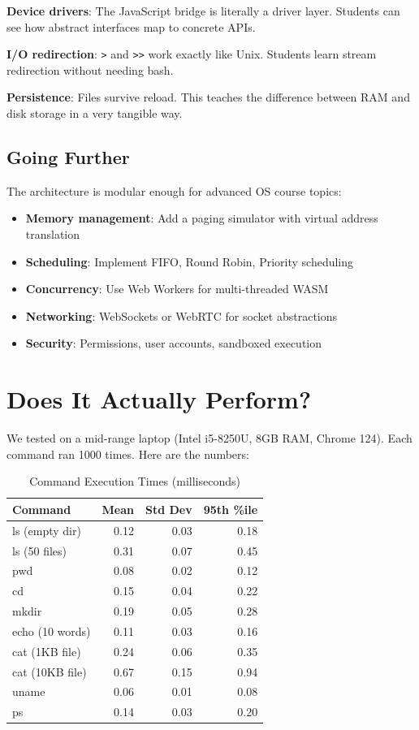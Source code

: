 \documentclass[conference]{IEEEtran}
\begin{document}
\textbf{Device drivers}: The JavaScript bridge is literally a driver layer. Students can see how abstract interfaces map to concrete APIs.

\textbf{I/O redirection}: \texttt{>} and \texttt{>>} work exactly like Unix. Students learn stream redirection without needing bash.

\textbf{Persistence}: Files survive reload. This teaches the difference between RAM and disk storage in a very tangible way.

\subsection{Going Further}

The architecture is modular enough for advanced OS course topics:

\begin{itemize}
    \item \textbf{Memory management}: Add a paging simulator with virtual address translation
    \item \textbf{Scheduling}: Implement FIFO, Round Robin, Priority scheduling
    \item \textbf{Concurrency}: Use Web Workers for multi-threaded WASM
    \item \textbf{Networking}: WebSockets or WebRTC for socket abstractions
    \item \textbf{Security}: Permissions, user accounts, sandboxed execution
\end{itemize}

\section{Does It Actually Perform?}

We tested on a mid-range laptop (Intel i5-8250U, 8GB RAM, Chrome 124). Each command ran 1000 times. Here are the numbers:

\begin{table}[h]
\centering
\caption{Command Execution Times (milliseconds)}
\begin{tabular}{|l|r|r|r|}
\hline
\textbf{Command} & \textbf{Mean} & \textbf{Std Dev} & \textbf{95th \%ile} \\
\hline
ls (empty dir) & 0.12 & 0.03 & 0.18 \\
ls (50 files) & 0.31 & 0.07 & 0.45 \\
pwd & 0.08 & 0.02 & 0.12 \\
cd & 0.15 & 0.04 & 0.22 \\
mkdir & 0.19 & 0.05 & 0.28 \\
echo (10 words) & 0.11 & 0.03 & 0.16 \\
cat (1KB file) & 0.24 & 0.06 & 0.35 \\
cat (10KB file) & 0.67 & 0.15 & 0.94 \\
uname & 0.06 & 0.01 & 0.08 \\
ps & 0.14 & 0.03 & 0.20 \\
\hline
\end{tabular}
\end{table}
\end{document}
